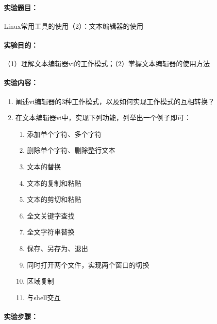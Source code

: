 \documentclass[cs4size,a4paper,nofonts]{ctexart}
\def\titlec{Linux常用工具的使用（2）：文本编辑器的使用}
\begin{document}




\paragraph{实验题目：}\titlec

\paragraph{实验目的：}
（1）理解文本编辑器vi的工作模式；（2）掌握文本编辑器的使用方法

\paragraph{实验内容：}
\begin{enumerate}
\item 阐述vi编辑器的3种工作模式，以及如何实现工作模式的互相转换？
\item 在文本编辑器vi中，实现下列功能，列举出一个例子即可：
\begin{enumerate}
\item 添加单个字符、多个字符
\item 删除单个字符、删除整行文本
\item 文本的替换
\item 文本的复制和粘贴
\item 文本的剪切和粘贴
\item 全文关键字查找
\item 全文字符串替换
\item 保存、另存为、退出
\item 同时打开两个文件，实现两个窗口的切换
\item 区域复制
\item 与shell交互
\end{enumerate}
\end{enumerate}

\paragraph{实验步骤：}\quad

\newcommand{\image}[3][width=\textwidth]{
  \begin{minipage}[t]{0.5\textwidth}
    \centering
        \texttt{[image: images/exp5/\#2.png]}
    \caption{#3}
    \label{fig:#3}
  \end{minipage}
}
\end{document}
